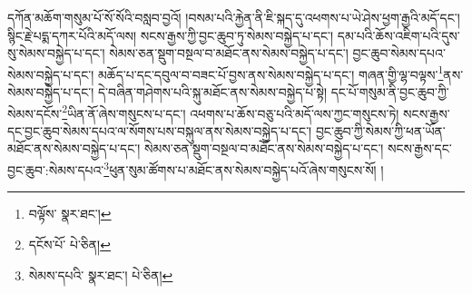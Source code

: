 དཀོན་མཆོག་གསུམ་པོ་སོ་སོའི་བསླབ་བྱའོ། །བསམ་པའི་རྐྱེན་ནི་ཇི་སྐད་དུ་འཕགས་པ་ཡེ་ཤེས་ཕྱག་རྒྱའི་མདོ་དང་། སྙིང་རྗེ་པདྨ་དཀར་པོའི་མདོ་ལས། སངས་རྒྱས་ཀྱི་བྱང་ཆུབ་ཏུ་སེམས་བསྐྱེད་པ་དང་། དམ་པའི་ཆོས་འཇིག་པའི་དུས་སུ་སེམས་བསྐྱེད་པ་དང་། སེམས་ཅན་སྡུག་བསྔལ་བ་མཐོང་ནས་སེམས་བསྐྱེད་པ་དང་། བྱང་ཆུབ་སེམས་དཔའ་སེམས་བསྐྱེད་པ་དང་། མཆོད་པ་དང་དབུལ་བ་བཟང་པོ་བྱས་ནས་སེམས་བསྐྱེད་པ་དང་། གཞན་གྱི་ལྷ་བལྟས་\footnote{བལྟོས་  སྣར་ཐང་། }ནས་སེམས་བསྐྱེད་པ་དང་། དེ་བཞིན་གཤེགས་པའི་སྐུ་མཐོང་ནས་སེམས་བསྐྱེད་པ་སྟེ། དང་པོ་གསུམ་ནི་བྱང་ཆུབ་ཀྱི་སེམས་དངོས་\footnote{དངོས་པོ་  པེ་ཅིན། }ཡིན་ནོ་ཞེས་གསུངས་པ་དང་། འཕགས་པ་ཆོས་བཅུ་པའི་མདོ་ལས་ཀྱང་གསུངས་ཏེ། སངས་རྒྱས་དང་བྱང་ཆུབ་སེམས་དཔའ་ལ་སོགས་པས་བསྐུལ་ནས་སེམས་བསྐྱེད་པ་དང་། བྱང་ཆུབ་ཀྱི་སེམས་ཀྱི་ཕན་ཡོན་མཐོང་ནས་སེམས་བསྐྱེད་པ་དང་། སེམས་ཅན་སྡུག་བསྔལ་བ་མཐོང་ནས་སེམས་བསྐྱེད་པ་དང་། སངས་རྒྱས་དང་བྱང་ཆུབ་:སེམས་དཔའ་\footnote{སེམས་དཔའི་  སྣར་ཐང་།  པེ་ཅིན། }ཕུན་སུམ་ཚོགས་པ་མཐོང་ནས་སེམས་བསྐྱེད་པའོ་ཞེས་གསུངས་སོ། །
